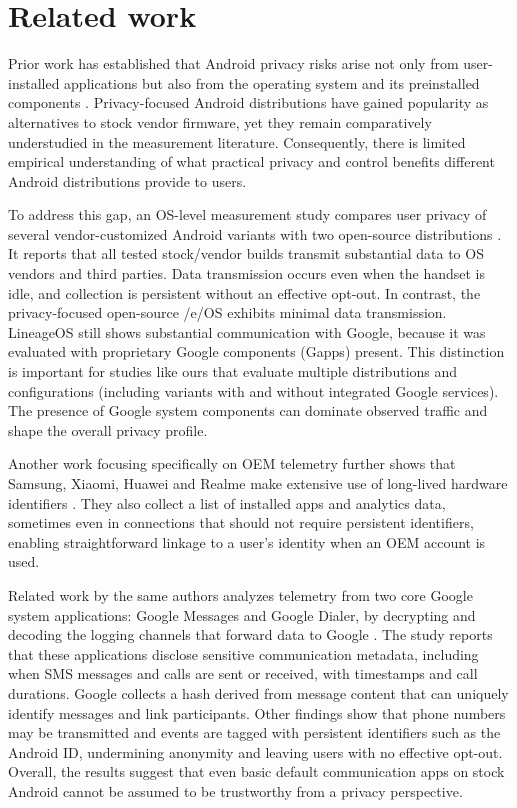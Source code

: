 \documentclass[runningheads]{llncs}
\begin{document}
\section{Related work}

Prior work has established that Android privacy risks arise not only from user-installed applications but also from the operating system and its preinstalled components \cite{android-os-snooping2021,android-os-snooping2023,google-dialer-messages,cookies-identifiers2025,google-data-collection2018}. Privacy-focused Android distributions have gained popularity as alternatives to stock vendor firmware, yet they remain comparatively understudied in the measurement literature. Consequently, there is limited empirical understanding of what practical privacy and control benefits different Android distributions provide to users.

To address this gap, an OS-level measurement study compares user privacy of several vendor-customized Android variants with two open-source distributions \cite{android-os-snooping2021}. It reports that all tested stock/vendor builds transmit substantial data to OS vendors and third parties. Data transmission occurs even when the handset is idle, and collection is persistent without an effective opt-out. In contrast, the privacy-focused open-source /e/OS exhibits minimal data transmission. LineageOS still shows substantial communication with Google, because it was evaluated with proprietary Google components (Gapps) present. This distinction is important for studies like ours that evaluate multiple distributions and configurations (including variants with and without integrated Google services). The presence of Google system components can dominate observed traffic and shape the overall privacy profile.

Another work focusing specifically on OEM telemetry further shows that Samsung, Xiaomi, Huawei and Realme make extensive use of long-lived hardware identifiers \cite{android-os-snooping2023}. They also collect a list of installed apps and analytics data, sometimes even in connections that should not require persistent identifiers, enabling straightforward linkage to a user’s identity when an OEM account is used.

Related work by the same authors analyzes telemetry from two core Google system applications: Google Messages and Google Dialer, by decrypting and decoding the logging channels that forward data to Google \cite{google-dialer-messages}. The study reports that these applications disclose sensitive communication metadata, including when SMS messages and calls are sent or received, with timestamps and call durations. Google collects a hash derived from message content that can uniquely identify messages and link participants. Other findings show that phone numbers may be transmitted and events are tagged with persistent identifiers such as the Android ID, undermining anonymity and leaving users with no effective opt-out. Overall, the results suggest that even basic default communication apps on stock Android cannot be assumed to be trustworthy from a privacy perspective.
\end{document}
